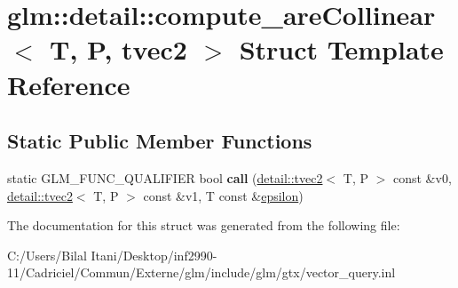\hypertarget{structglm_1_1detail_1_1compute__are_collinear_3_01_t_00_01_p_00_01tvec2_01_4}{}\section{glm\+:\+:detail\+:\+:compute\+\_\+are\+Collinear$<$ T, P, tvec2 $>$ Struct Template Reference}
\label{structglm_1_1detail_1_1compute__are_collinear_3_01_t_00_01_p_00_01tvec2_01_4}
\subsection*{Static Public Member Functions}
\begin{DoxyCompactItemize}
\item 
static G\+L\+M\+\_\+\+F\+U\+N\+C\+\_\+\+Q\+U\+A\+L\+I\+F\+I\+ER bool {\bfseries call} (\hyperlink{structglm_1_1detail_1_1tvec2}{detail\+::tvec2}$<$ T, P $>$ const \&v0, \hyperlink{structglm_1_1detail_1_1tvec2}{detail\+::tvec2}$<$ T, P $>$ const \&v1, T const \&\hyperlink{group__gtc__constants_gacb41049b8d22c8aa90e362b96c524feb}{epsilon})\hypertarget{structglm_1_1detail_1_1compute__are_collinear_3_01_t_00_01_p_00_01tvec2_01_4_a2f040e5d783927c363a8c14c5cec65d8}{}\label{structglm_1_1detail_1_1compute__are_collinear_3_01_t_00_01_p_00_01tvec2_01_4_a2f040e5d783927c363a8c14c5cec65d8}

\end{DoxyCompactItemize}


The documentation for this struct was generated from the following file\+:\begin{DoxyCompactItemize}
\item 
C\+:/\+Users/\+Bilal Itani/\+Desktop/inf2990-\/11/\+Cadriciel/\+Commun/\+Externe/glm/include/glm/gtx/vector\+\_\+query.\+inl\end{DoxyCompactItemize}
